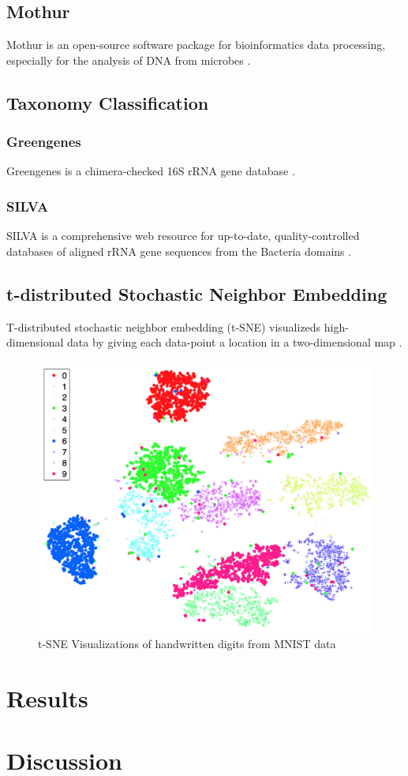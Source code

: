 \documentclass[11pt, a4paper]{article}
\begin{document}
        \subsection{Mothur}
            Mothur is an open-source software package for bioinformatics data processing, especially for the analysis of DNA from microbes \cite{mothur1}.

        \subsection{Taxonomy Classification}
            \subsubsection{Greengenes}
                Greengenes is a chimera-checked 16S rRNA gene database \cite{greengenes1}.

            \subsubsection{SILVA}
                SILVA is a comprehensive web resource for up-to-date, quality-controlled databases of aligned rRNA gene sequences from the Bacteria domains \cite{silva1, silva2}.

        \subsection[t-SNE]{t-distributed Stochastic Neighbor Embedding}
            T-distributed stochastic neighbor embedding (t-SNE) visualizeds high-dimensional data by giving each data-point a location in a two-dimensional map \cite{tsne1}.

            \begin{figure}[htbp]
                \centering
                \includegraphics[width=0.5 \linewidth]{figures/tsne.png}
                \caption{t-SNE Visualizations of handwritten digits from MNIST data \protect \cite{tsne1}}
                \label{fig:tsne}
            \end{figure}

    \section{Results}

    \section{Discussion}

    
    
\end{document}
